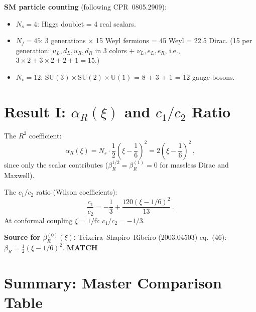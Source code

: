 \documentclass[12pt,a4paper]{article}
\theoremstyle{definition}
\theoremstyle{remark}
\newcommand{\match}{\textcolor{green!60!black}{\textbf{MATCH}}}
\begin{document}
\medskip\noindent
\textbf{SM particle counting} (following CPR~0805.2909):
\begin{itemize}[nosep]
\item $N_s = 4$: Higgs doublet = 4 real scalars.
\item $N_f = 45$: 3 generations $\times$ 15 Weyl fermions = 45 Weyl = 22.5 Dirac.
  (15 per generation: $u_L, d_L, u_R, d_R$ in 3 colors + $\nu_L, e_L, e_R$,
  i.e., $3 \times 2 + 3 \times 2 + 2 + 1 = 15$.)
\item $N_v = 12$: $\mathrm{SU}(3) \times \mathrm{SU}(2) \times \mathrm{U}(1)$
  = 8 + 3 + 1 = 12 gauge bosons.
\end{itemize}


\section{Result I: $\alpha_R(\xi)$ and $c_1/c_2$ Ratio}
\label{sec:alphaR}

The $R^2$ coefficient:
\begin{equation}
  \alpha_R(\xi) = N_s \cdot \frac{1}{2}\!\left(\xi - \frac{1}{6}\right)^{\!2}
  = 2\!\left(\xi - \frac{1}{6}\right)^{\!2}\,,
\end{equation}
since only the scalar contributes ($\beta_R^{1/2} = \beta_R^{(1)} = 0$
for massless Dirac and Maxwell).

The $c_1/c_2$ ratio (Wilson coefficients):
\begin{equation}
  \frac{c_1}{c_2} = -\frac{1}{3} + \frac{120(\xi - 1/6)^2}{13}\,.
\end{equation}
At conformal coupling $\xi = 1/6$: $c_1/c_2 = -1/3$.

\textbf{Source for $\beta_R^{(0)}(\xi)$:}
Teixeira--Shapiro--Ribeiro (2003.04503) eq.~(46):
$\beta_R = \frac{1}{2}(\xi - 1/6)^2$.  \match


\section{Summary: Master Comparison Table}
\label{sec:summary}
\end{document}
